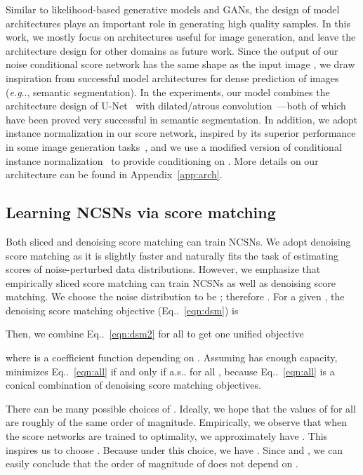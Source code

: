 \documentclass{article}
\makeatletter
\def\@onedot{\ifx\@let@token.\else.\null\fi\xspace}
\DeclareRobustCommand\onedot{\futurelet\@let@token\@onedot}
\newcommand{\eqnref}[1]{Eq\onedot~\eqref{#1}}
\def\eg{\emph{e.g}\onedot}
\def\as{a.s\onedot}
\makeatother
\begin{document}
Similar to likelihood-based generative models and GANs, the design of model architectures plays an important role in generating high quality samples. In this work, we mostly focus on architectures useful for image generation, and leave the architecture design for other domains as future work. Since the output of our noise conditional score network  has the same shape as the input image , we draw inspiration from successful model architectures for dense prediction of images (\eg, semantic segmentation). In the experiments, our model  combines the architecture design of U-Net~\cite{ronneberger2015unet} with dilated/atrous convolution~\cite{Yu2016,Yu2017,chen2017deeplab}---both of which have been proved very successful in semantic segmentation. In addition, we adopt instance normalization in our score network, inspired by its superior performance in some image generation tasks~\cite{ulyanov2016instance,dumoulin2017learned-iclr,huang2017arbitrary}, and we use a modified version of conditional instance normalization~\cite{dumoulin2017learned-iclr} to provide conditioning on . More details on our architecture can be found in Appendix~\ref{app:arch}.

\subsection{Learning NCSNs via score matching}

Both sliced and denoising score matching can train NCSNs. We adopt denoising score matching as it is slightly faster and naturally fits the task of estimating scores of noise-perturbed data distributions. However, we emphasize that empirically sliced score matching can train NCSNs as well as denoising score matching. We choose the noise distribution to be ; therefore . For a given , the denoising score matching objective (\eqnref{eqn:dsm}) is

Then, we combine \eqnref{eqn:dsm2} for all  to get one unified objective

where  is a coefficient function depending on . Assuming  has enough capacity,  minimizes \eqnref{eqn:all} if and only if  \as for all , because \eqnref{eqn:all} is a conical combination of  denoising score matching objectives.

There can be many possible choices of . Ideally, we hope that the values of  for all  are roughly of the same order of magnitude. Empirically, we observe that when the score networks are trained 
to optimality,
we approximately have . This inspires us to choose . Because under this choice, we have . Since  and , we can easily conclude that the order of magnitude of  does not depend on .
\end{document}
